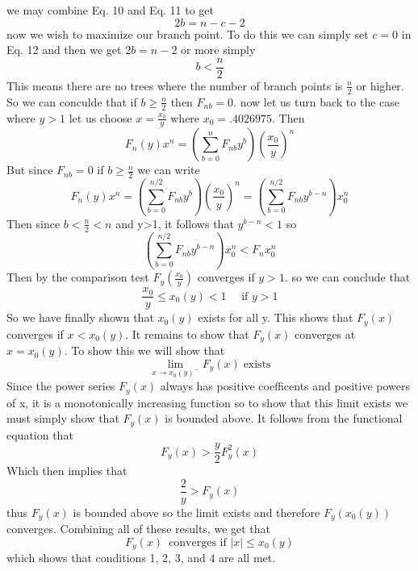 \documentclass{article}
\begin{document}
we may combine Eq. 10 and Eq. 11 to get
\begin{equation}
2b=n-c-2
\end{equation}
now we wish to maximize our branch point. To do this we can simply set \(c=0\) in Eq. 12 and then we get \(2b=n-2\) or more simply
\begin{equation}
b<\frac{n}{2}
\end{equation}
This means there are no trees where the number of branch points is \(\frac{n}{2}\) or higher. So we can conculde that if \(b \geq \frac{n}{2}\) then \(F_{nb}=0\).
now let us turn back to the case where \(y>1\) let us choose \(x=\frac{x_0}{y}\) where \(x_0 =.4026975\). Then
\begin{equation}
F_n(y)x^n=\left(\sum_{b=0}^nF_{nb}y^b\right)\left(\frac{x_0}{y}\right)^n
\end{equation}
But since \(F_{nb}=0\) if \(b \geq \frac{n}{2}\) we can write
\begin{equation}
F_n(y)x^n=\left(\sum_{b=0}^{n/2}F_{nb}y^b\right)\left(\frac{x_0}{y}\right)^n=\left(\sum_{b=0}^{n/2}F_{nb}y^{b-n}\right)x_0^n
\end{equation}
Then since \(b<\frac{n}{2}<n\) and y>1, it follows that \(y^{b-n}<1\) so 
\begin{equation}
\left(\sum_{b=0}^{n/2}F_{nb}y^{b-n}\right)x_0^n<F_nx_0^n
\end{equation}
Then by the comparison test \(F_y(\frac{x_0}{y})\) converges if \(y>1\). so we can conclude that
\begin{equation}
\frac{x_0}{y}\leq x_0(y) <1 \quad \text { if } y >1
\end{equation}
So we have finally shown that \(x_0(y)\) exists for all y. This shows that \(F_y(x)\) converges if \(x<x_0(y)\). It remains to show that \(F_y(x)\) converges at \(x=x_0(y)\). To show this we will show that 
\[\lim_{x \to x_0(y)^-}F_y(x) \; \text{exists}\]
Since the power series \(F_y(x)\) always has positive coefficents and positive powers of x, it is a monotonically increasing function so to show that this limit exists we must simply show that \(F_y(x)\) is bounded above. It follows from the functional equation that 
\[F_y(x)>\frac{y}{2}F_y^2(x)\]
Which then implies that 
\begin{equation}
\frac{2}{y}>F_y(x)
\end{equation}
thus \(F_y(x)\) is bounded above so the limit exists and therefore \(F_y(x_0(y))\) converges. 
Combining all of these results, we get that 
\begin{equation}
F_y(x) \, \text{ converges if } |x|\leq x_0(y)
\end{equation}
which shows that conditions 1, 2, 3, and 4 are all met. 
\end{document}
